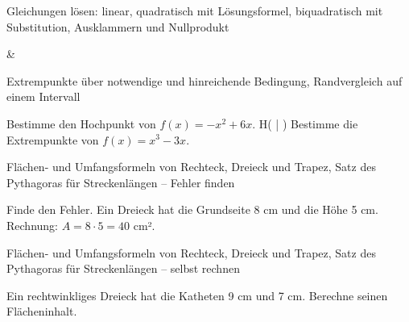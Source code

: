 \begin{aufgabe}{Gleichungen lösen: linear, quadratisch mit Lösungsformel, biquadratisch mit Substitution, Ausklammern und Nullprodukt}
\begin{gleichungsraster}[2]
 &
 \\
\end{gleichungsraster}
\end{aufgabe}

\begin{aufgabe}{Extrempunkte über notwendige und hinreichende Bedingung, Randvergleich auf einem Intervall}
\begin{teile}
\teil Bestimme den Hochpunkt von $f(x) = -x^2 + 6x$. H( \leerfeld | \leerfeld )
\teil Bestimme die Extrempunkte von $f(x) = x^3 - 3x$.
\end{teile}
\end{aufgabe}

\begin{aufgabe}{Flächen- und Umfangsformeln von Rechteck, Dreieck und Trapez, Satz des Pythagoras für Streckenlängen – Fehler finden}
\begin{teile}
\teil Finde den Fehler. Ein Dreieck hat die Grundseite 8 cm und die Höhe 5 cm. Rechnung: $A = 8 \cdot 5 = 40$ cm².
\end{teile}
\end{aufgabe}

\begin{aufgabe}{Flächen- und Umfangsformeln von Rechteck, Dreieck und Trapez, Satz des Pythagoras für Streckenlängen – selbst rechnen}
\begin{teile}
\teil Ein rechtwinkliges Dreieck hat die Katheten 9 cm und 7 cm. Berechne seinen Flächeninhalt. \leerfeld[cm²]
\end{teile}
\end{aufgabe}
